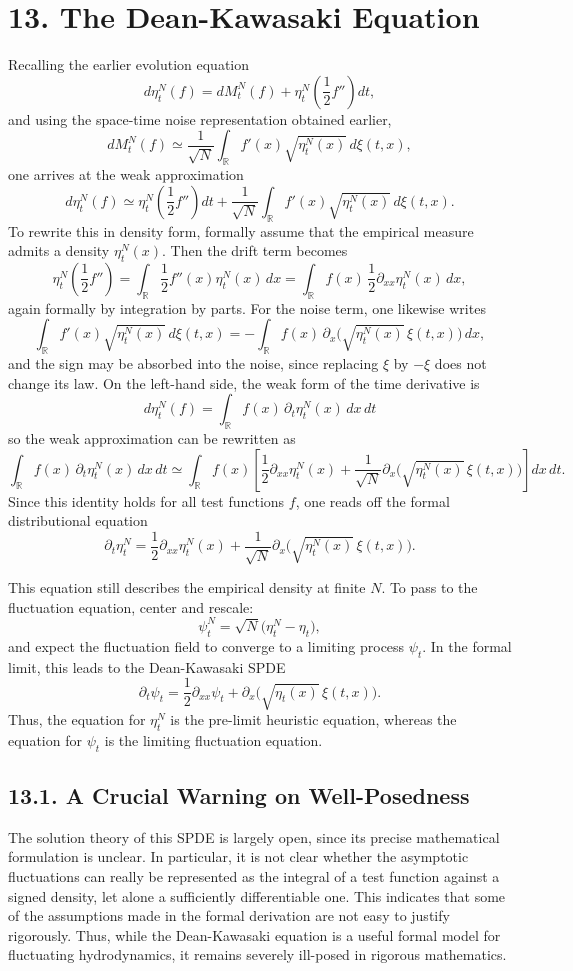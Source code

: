 \documentclass[11pt]{article}
\theoremstyle{definition}
\theoremstyle{remark}
\begin{document}
\section*{13. The Dean-Kawasaki Equation}
Recalling the earlier evolution equation
\[
d\eta_t^N(f)=dM_t^N(f)+\eta_t^N\!\left(\frac{1}{2}f''\right)dt,
\]
and using the space-time noise representation obtained earlier,
\[
dM_t^N(f)\simeq \frac{1}{\sqrt{N}}\int_{\mathbb R} f'(x)\sqrt{\eta_t^N(x)}\,d\xi(t,x),
\]
one arrives at the weak approximation
\[
d\eta_t^N(f)\simeq \eta_t^N\!\left(\frac{1}{2}f''\right)dt+\frac{1}{\sqrt{N}}\int_{\mathbb R} f'(x)\sqrt{\eta_t^N(x)}\,d\xi(t,x).
\]
To rewrite this in density form, formally assume that the empirical measure admits a density $\eta_t^N(x)$. Then the drift term becomes
\[
\eta_t^N\!\left(\frac{1}{2}f''\right)=\int_{\mathbb R} \frac{1}{2}f''(x)\eta_t^N(x)\,dx=\int_{\mathbb R} f(x)\,\frac{1}{2}\partial_{xx}\eta_t^N(x)\,dx,
\]
again formally by integration by parts. For the noise term, one likewise writes
\[
\int_{\mathbb R} f'(x)\sqrt{\eta_t^N(x)}\,d\xi(t,x)=-\int_{\mathbb R} f(x)\,\partial_x\bigl(\sqrt{\eta_t^N(x)}\,\xi(t,x)\bigr)\,dx,
\]
and the sign may be absorbed into the noise, since replacing $\xi$ by $-\xi$ does not change its law. On the left-hand side, the weak form of the time derivative is
\[
d\eta_t^N(f)=\int_{\mathbb R} f(x)\,\partial_t\eta_t^N(x)\,dx\,dt
\]
so the weak approximation can be rewritten as
\[
\int_{\mathbb R} f(x)\,\partial_t\eta_t^N(x)\,dx\,dt \simeq \int_{\mathbb R} f(x)\left[\frac{1}{2}\partial_{xx}\eta_t^N(x)+\frac{1}{\sqrt{N}}\partial_x\bigl(\sqrt{\eta_t^N(x)}\,\xi(t,x)\bigr)\right]dx\,dt.
\]
Since this identity holds for all test functions $f$, one reads off the formal distributional equation
\[
\partial_t\eta_t^N=\frac{1}{2}\partial_{xx}\eta_t^N(x)+\frac{1}{\sqrt{N}}\partial_x\bigl(\sqrt{\eta_t^N(x)}\,\xi(t,x)\bigr).
\]

This equation still describes the empirical density at finite $N$. To pass to the fluctuation equation, center and rescale:
\[
\psi_t^N=\sqrt{N}\bigl(\eta_t^N-\eta_t\bigr),
\]
and expect the fluctuation field to converge to a limiting process $\psi_t$. In the formal limit, this leads to the Dean-Kawasaki SPDE
\[
\partial_t\psi_t=\frac{1}{2}\partial_{xx}\psi_t+\partial_x\bigl(\sqrt{\eta_t(x)}\,\xi(t,x)\bigr).
\]
Thus, the equation for $\eta_t^N$ is the pre-limit heuristic equation, whereas the equation for $\psi_t$ is the limiting fluctuation equation.

\subsection*{13.1. A Crucial Warning on Well-Posedness}
The solution theory of this SPDE is largely open, since its precise mathematical formulation is unclear. In particular, it is not clear whether the asymptotic fluctuations can really be represented as the integral of a test function against a signed density, let alone a sufficiently differentiable one. This indicates that some of the assumptions made in the formal derivation are not easy to justify rigorously. Thus, while the Dean-Kawasaki equation is a useful formal model for fluctuating hydrodynamics, it remains severely ill-posed in rigorous mathematics.
\end{document}
